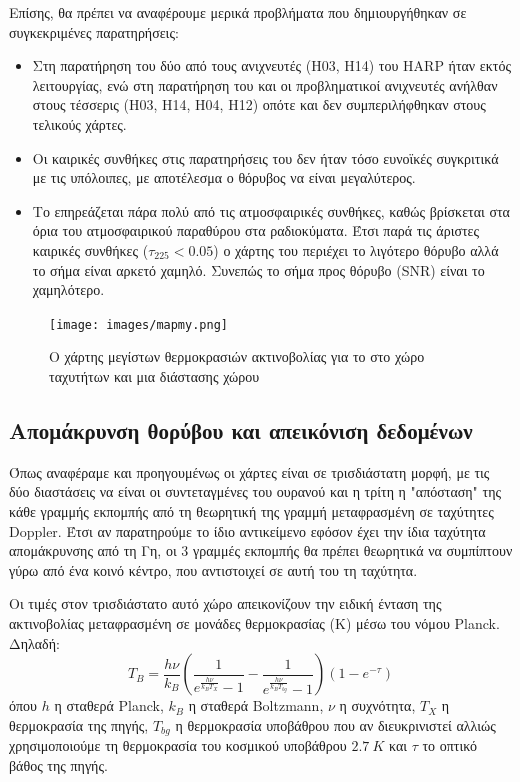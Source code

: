 \documentclass[a4paper,12pt]{memoir}
\begin{document}
Επίσης, θα πρέπει να αναφέρουμε μερικά προβλήματα που δημιουργήθηκαν σε συγκεκριμένες παρατηρήσεις:
\begin{itemize}
\item Στη παρατήρηση του  δύο από τους ανιχνευτές (H03, H14) του HARP ήταν εκτός λειτουργίας, ενώ στη παρατήρηση του  και  οι προβληματικοί ανιχνευτές ανήλθαν στους τέσσερις (H03, H14, H04, H12) οπότε και δεν συμπεριλήφθηκαν στους τελικούς χάρτες. 
\item Οι καιρικές συνθήκες στις παρατηρήσεις του  δεν ήταν τόσο ευνοϊκές συγκριτικά με τις υπόλοιπες, με αποτέλεσμα ο θόρυβος να είναι μεγαλύτερος.
\item Το  επηρεάζεται πάρα πολύ από τις ατμοσφαιρικές συνθήκες, καθώς βρίσκεται στα όρια του ατμοσφαιρικού παραθύρου στα ραδιοκύματα. Έτσι παρά τις άριστες καιρικές συνθήκες ($\tau _{225} <0.05$) ο χάρτης του  περιέχει το λιγότερο θόρυβο αλλά το σήμα είναι αρκετό χαμηλό. Συνεπώς το σήμα προς θόρυβο (SNR) είναι το χαμηλότερο.

\end{itemize}

\begin{figure}
	\begin{flushleft}
		\texttt{[image: images/mapmy.png]}
		\caption{Ο χάρτης μεγίστων θερμοκρασιών ακτινοβολίας για το  στο χώρο ταχυτήτων και μια διάστασης χώρου}
	\end{flushleft}
\end{figure}

\subsection{Απομάκρυνση θορύβου και απεικόνιση δεδομένων}
Όπως αναφέραμε και προηγουμένως οι χάρτες είναι σε τρισδιάστατη μορφή, με τις δύο διαστάσεις να είναι οι συντεταγμένες του ουρανού και η τρίτη η "απόσταση" της κάθε γραμμής εκπομπής από τη θεωρητική της γραμμή μεταφρασμένη σε ταχύτητες Doppler. Έτσι αν παρατηρούμε το ίδιο αντικείμενο εφόσον έχει την ίδια ταχύτητα απομάκρυνσης από τη Γη, οι 3 γραμμές εκπομπής θα πρέπει θεωρητικά να συμπίπτουν γύρω από ένα κοινό κέντρο, που αντιστοιχεί σε αυτή του τη ταχύτητα.

Οι τιμές στον τρισδιάστατο αυτό χώρο απεικονίζουν την ειδική ένταση της ακτινοβολίας μεταφρασμένη σε μονάδες θερμοκρασίας (K) μέσω του νόμου Planck. Δηλαδή:
\begin{equation}
\label{eq:TB}
T_B=\frac{h \nu}{k_B} \left( \frac{1}{e^{\frac{h \nu}{k_B T_X}}-1}-\frac{1}{e^{\frac{h \nu}{k_B T_{bg}}}-1} \right) \left( 1-e^{-\tau} \right) 
\end{equation}
όπου $h$ η σταθερά Planck, $k_B$ η σταθερά Boltzmann, $\nu$ η συχνότητα, $T_X$ η θερμοκρασία της πηγής, $T_{bg} $ η θερμοκρασία υποβάθρου που αν διευκρινιστεί αλλιώς χρησιμοποιούμε τη θερμοκρασία του κοσμικού υποβάθρου $2.7\ K$ και $\tau$ το οπτικό βάθος της πηγής.
\end{document}
